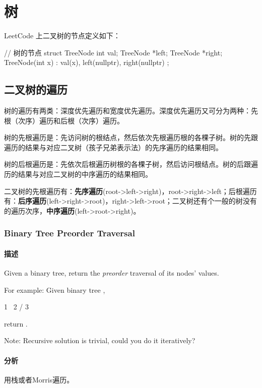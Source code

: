 \chapter{树}

LeetCode 上二叉树的节点定义如下：
\begin{Code}
// 树的节点
struct TreeNode {
    int val;
    TreeNode *left;
    TreeNode *right;
    TreeNode(int x) : val(x), left(nullptr), right(nullptr) { }
};
\end{Code}


\section{二叉树的遍历} %

树的遍历有两类：深度优先遍历和宽度优先遍历。深度优先遍历又可分为两种：先根（次序）遍历和后根（次序）遍历。

树的先根遍历是：先访问树的根结点，然后依次先根遍历根的各棵子树。树的先跟遍历的结果与对应二叉树（孩子兄弟表示法）的先序遍历的结果相同。

树的后根遍历是：先依次后根遍历树根的各棵子树，然后访问根结点。树的后跟遍历的结果与对应二叉树的中序遍历的结果相同。

二叉树的先根遍历有：\textbf{先序遍历}(root->left->right)，root->right->left；后根遍历有：\textbf{后序遍历}(left->right->root)，right->left->root；二叉树还有个一般的树没有的遍历次序，\textbf{中序遍历}(left->root->right)。


\subsection{Binary Tree Preorder Traversal}
\label{sec:binary-tree-preorder-traversal}


\subsubsection{描述}
Given a binary tree, return the \emph{preorder} traversal of its nodes' values.

For example:
Given binary tree ,
\begin{Code}
 1
  \
   2
  /
 3
\end{Code}
return \code{[1,2,3]}.

Note: Recursive solution is trivial, could you do it iteratively?


\subsubsection{分析}
用栈或者Morris遍历。


